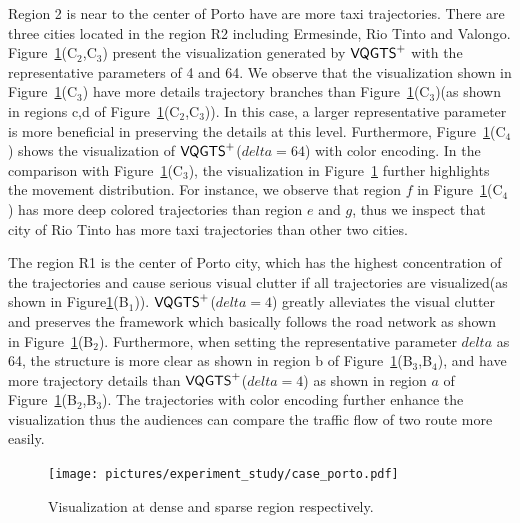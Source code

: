 Region 2 is near to the center of Porto have are more taxi trajectories. There are three cities located in the region R2 including Ermesinde, Rio Tinto and Valongo.  
Figure~\ref{fig:porto}(C$_2$,C$_3$) present the visualization generated by $\mathsf{VQGTS}^{+}$ with the representative parameters of 4 and 64. We observe that the visualization shown in Figure~\ref{fig:porto}(C$_3$) have more details trajectory branches than Figure~\ref{fig:porto}(C$_3$)(as shown in regions c,d of Figure~\ref{fig:porto}(C$_2$,C$_3$)). In this case, a larger representative parameter is more beneficial in preserving the details at this level. Furthermore, Figure~\ref{fig:porto}(C$_4$) shows the visualization of $\mathsf{VQGTS}^{+}$($delta = 64$) with color encoding. In the comparison with Figure~\ref{fig:porto}(C$_3$), the visualization in Figure~\ref{fig:porto} further highlights the movement distribution. 
For instance, we observe that region $f$ in Figure~\ref{fig:porto}(C$_4$) has more deep colored trajectories than region $e$ and $g$, thus we inspect that city of Rio Tinto has more taxi trajectories than other two cities.

The region R1 is the center of Porto city, which has the highest concentration of the trajectories and cause serious visual clutter if all trajectories are visualized(as shown in Figure\ref{fig:porto}(B$_1$)). $\mathsf{VQGTS}^{+}$($delta = 4$) greatly alleviates the visual clutter and preserves the framework which basically follows the road network as shown in Figure~\ref{fig:porto}(B$_2$). Furthermore, when setting the representative parameter $delta$ as 64, the structure is more clear as shown in region b of Figure~\ref{fig:porto}(B$_3$,B$_4$), and have more trajectory details than $\mathsf{VQGTS}^{+}$($delta = 4$) as shown in region $a$ of Figure~\ref{fig:porto}(B$_2$,B$_3$). The trajectories with color encoding further enhance the visualization thus the audiences can compare the traffic flow of two route more easily.   
 
 

\begin{figure}[t]
	\centering
	\vspace{2mm}
	\texttt{[image: pictures/experiment\_study/case\_porto.pdf]}
	\caption{Visualization at dense and sparse region respectively.}
	\vspace{0mm}
	\label{fig:porto}
\end{figure}

